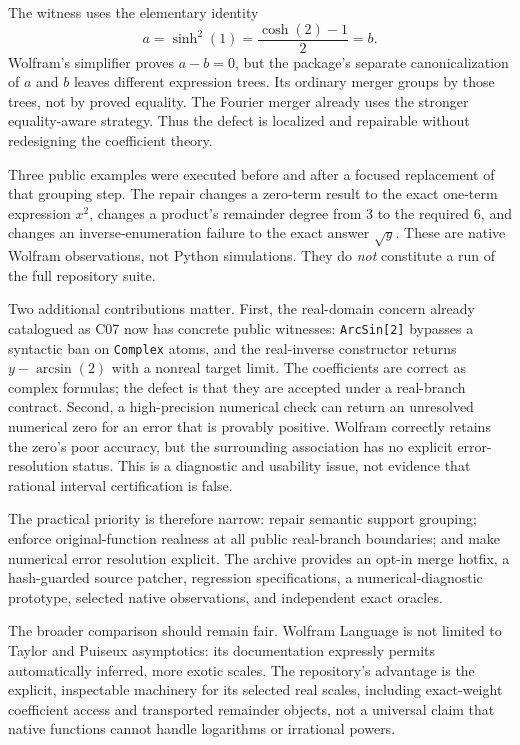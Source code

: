 \documentclass[11pt,letterpaper]{article}
\newcommand{\code}[1]{{\small\nolinkurl{#1}}}
\begin{document}
The witness uses the elementary identity
\[
 a=\sinh^2(1)=\frac{\cosh(2)-1}{2}=b.
\]
Wolfram's simplifier proves $a-b=0$, but the package's separate canonicalization of $a$ and $b$ leaves different expression trees. Its ordinary merger groups by those trees, not by proved equality. The Fourier merger already uses the stronger equality-aware strategy. Thus the defect is localized and repairable without redesigning the coefficient theory.\cite{core,fourier}

Three public examples were executed before and after a focused replacement of that grouping step. The repair changes a zero-term result to the exact one-term expression $x^2$, changes a product's remainder degree from $3$ to the required $6$, and changes an inverse-enumeration failure to the exact answer $\sqrt y$. These are native Wolfram observations, not Python simulations. They do \emph{not} constitute a run of the full repository suite.

Two additional contributions matter. First, the real-domain concern already catalogued as C07 now has concrete public witnesses: \code{ArcSin[2]} bypasses a syntactic ban on \code{Complex} atoms, and the real-inverse constructor returns $y-\arcsin(2)$ with a nonreal target limit. The coefficients are correct as complex formulas; the defect is that they are accepted under a real-branch contract. Second, a high-precision numerical check can return an unresolved numerical zero for an error that is provably positive. Wolfram correctly retains the zero's poor accuracy, but the surrounding association has no explicit error-resolution status. This is a diagnostic and usability issue, not evidence that rational interval certification is false.\cite{core,numerical,real-domain}

The practical priority is therefore narrow: repair semantic support grouping; enforce original-function realness at all public real-branch boundaries; and make numerical error resolution explicit. The archive provides an opt-in merge hotfix, a hash-guarded source patcher, regression specifications, a numerical-diagnostic prototype, selected native observations, and independent exact oracles.

The broader comparison should remain fair. Wolfram Language is not limited to Taylor and Puiseux asymptotics: its documentation expressly permits automatically inferred, more exotic scales. The repository's advantage is the explicit, inspectable machinery for its selected real scales, including exact-weight coefficient access and transported remainder objects, not a universal claim that native functions cannot handle logarithms or irrational powers.\cite{wl-asymptotic,wl-solve}
\end{document}

